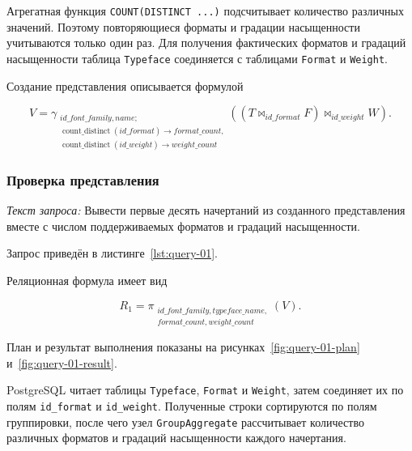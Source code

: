 Агрегатная функция \texttt{COUNT(DISTINCT ...)} подсчитывает
количество различных значений. Поэтому повторяющиеся форматы и градации
насыщенности учитываются только один раз. Для получения фактических форматов
и градаций насыщенности таблица \texttt{Typeface} соединяется с
таблицами \texttt{Format} и \texttt{Weight}.

Создание представления описывается формулой

\[
V = \gamma_{\substack{id\_font\_family,name;\\
\operatorname{count\_distinct}(id\_format) \rightarrow format\_count,\\
\operatorname{count\_distinct}(id\_weight) \rightarrow weight\_count}}
\left(
    \left(T \bowtie_{id\_format} F\right)
    \bowtie_{id\_weight} W
\right).
\]

\subsubsection{Проверка представления}

\textit{Текст запроса:} Вывести первые десять начертаний из созданного представления вместе с числом
поддерживаемых форматов и градаций насыщенности.

Запрос приведён в листинге~\ref{lst:query-01}.


Реляционная формула имеет вид

\[
R_1 = \pi_{\substack{id\_font\_family,typeface\_name,\\
format\_count,weight\_count}}(V).
\]

План и результат выполнения показаны на
рисунках~\ref{fig:query-01-plan} и~\ref{fig:query-01-result}.


PostgreSQL читает таблицы \texttt{Typeface},
\texttt{Format} и \texttt{Weight}, затем соединяет их по
полям \texttt{id_format} и \texttt{id_weight}. Полученные
строки сортируются по полям группировки, после чего узел
\texttt{GroupAggregate} рассчитывает количество различных форматов
и градаций насыщенности каждого начертания.


